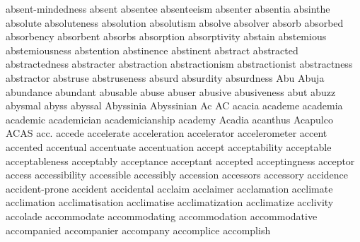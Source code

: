 absent-mindedness absent absentee absenteeism absenter absentia absinthe absolute absoluteness absolution absolutism absolve absolver absorb absorbed absorbency absorbent absorbs absorption absorptivity abstain abstemious abstemiousness abstention abstinence abstinent abstract abstracted abstractedness abstracter abstraction abstractionism abstractionist abstractness abstractor abstruse abstruseness absurd absurdity absurdness Abu Abuja abundance abundant abusable abuse abuser abusive abusiveness abut abuzz abysmal abyss abyssal Abyssinia Abyssinian Ac AC acacia academe academia academic academician academicianship academy Acadia acanthus Acapulco ACAS acc. accede accelerate acceleration accelerator accelerometer accent accented accentual accentuate accentuation accept acceptability acceptable acceptableness acceptably acceptance acceptant accepted acceptingness acceptor access accessibility accessible accessibly accession accessors accessory accidence accident-prone accident accidental acclaim acclaimer acclamation acclimate acclimation acclimatisation acclimatise acclimatization acclimatize acclivity accolade accommodate accommodating accommodation accommodative accompanied accompanier accompany accomplice accomplish 